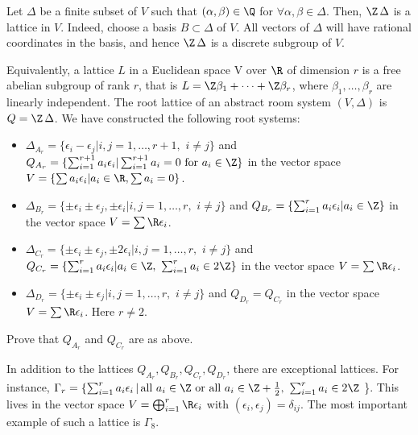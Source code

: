 \documentclass[11pt]{article}
\newenvironment{example}[1][Example]{\begin{trivlist}
\item[\hskip \labelsep {\bfseries #1}]}{\end{trivlist}}
\newenvironment{exercise}[1][Exercise]{\begin{trivlist}
\item[\hskip \labelsep {\bfseries #1}]}{\end{trivlist}}
\begin{document}
\begin{example}
Let $\Delta$ be a finite subset of $V$ such that
$(\alpha,\beta)\in \Q$ for $\forall \alpha,\beta \in \Delta$.
Then, $\Z \, \Delta$ is a lattice in $V$.  Indeed, choose a basis
$B \subset \Delta$ of $V$.  All vectors of $\Delta$ will have
rational coordinates in the basis, and hence $\Z \, \Delta$ is a
discrete subgroup of $V$.
\end{example}
%
Equivalently, a lattice $L$ in a Euclidean space V over $\R$ of
dimension $r$ is a free abelian subgroup of rank $r$, that is $L =
\Z \beta_1 + \cdots + \Z \beta_r$, where $\beta_1,\ldots,\beta_r$
are linearly independent.
%
The root lattice of an abstract room system $(V,\Delta)$ is $Q =
\Z \, \Delta$.  We have constructed the following root systems:
%
\begin{itemize}
\item $\Delta_{A_r} = \{ \epsilon_i - \epsilon_j |
i,j=1,\ldots,r+1, \,\, i\not = j \}$ and $Q_{A_r} = \{ \sum _{i=1}
^{r+1} a_i \epsilon_i | \sum _{i=1}^{r+1}a_i=0 \mbox{ for } a_i
\in \Z \}$ in the vector space $V = \{ \sum a_i \epsilon_i | a_i
\in \R, \sum a_i = 0 \}$.
%
\item $\Delta_{B_r} = \{ \pm \epsilon_i \pm \epsilon_j, \pm
\epsilon_i | i,j=1,\ldots,r, \,\, i\not = j \}$ and $Q_{B_r} = \{
\sum _{i=1} ^{r} a_i \epsilon_i | a_i \in \Z \}$ in the vector
space $V = \sum \R \epsilon_i $.
%
\item $\Delta_{C_r} = \{ \pm \epsilon_i \pm \epsilon_j, \pm 2
\epsilon_i | i,j=1,\ldots,r, \,\, i\not = j \}$ and $Q_{C_r} = \{
\sum _{i=1} ^{r} a_i \epsilon_i | a_i \in \Z, \,\, \sum_{i=1}^{r}
a_i \in 2 \Z \}$ in the vector space $V = \sum \R \epsilon_i $.
%
\item $\Delta_{D_r} = \{ \pm \epsilon_i \pm \epsilon_j |
i,j=1,\ldots,r, \,\, i \not = j \}$ and $Q_{D_r} = Q_{C_r}$ in the
vector space $V = \sum \R \epsilon_i $.  Here $r \not = 2$.
\end{itemize}
%
\begin{exercise}
Prove that $Q_{A_r}$ and $Q_{C_r}$ are as above.
\end{exercise}
%
In addition to the lattices $Q_{A_r}, Q_{B_r}, Q_{C_r}, Q_{D_r}$,
there are exceptional lattices.  For instance, $\Gamma_r = \{
\sum_{i=1}^r a_i \epsilon_i \, | \, \mbox{all } a_i \in \Z \mbox{
or all } a_i \in \Z + \frac{1}{2}, \,\, \sum_{i=1}^{r} a_i \in 2
\Z$ \}.  This lives in the vector space $V = \bigoplus_{i=1}^{r}
\R \epsilon_i$ with $(\epsilon_i, \epsilon_j) = \delta_{ij}$.  The
most important example of such a lattice is $\Gamma_8$.
\end{document}
